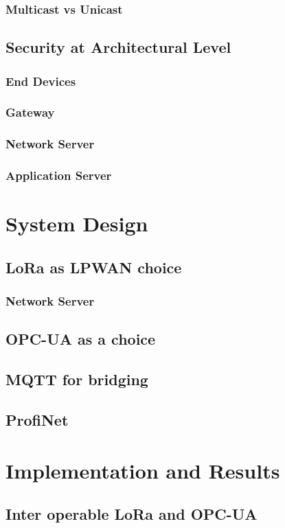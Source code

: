 \documentclass{book}
\begin{document}
\subsection{Multicast vs Unicast}
\section{Security at Architectural Level}
\subsection{End Devices}
\subsection{Gateway}
\subsection{Network Server}
\subsection{Application Server}

\chapter{System Design}
\section{LoRa as LPWAN choice}
\subsection{Network Server}
\section{OPC-UA as a choice}
\section{MQTT for bridging}
\section{ProfiNet}

\chapter{Implementation and Results}
\section{Inter operable LoRa and OPC-UA}
\end{document}
